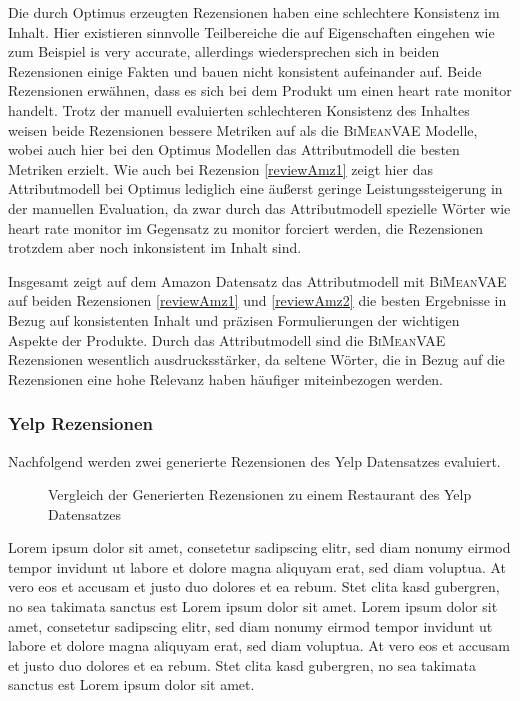 Die durch Optimus erzeugten Rezensionen haben eine schlechtere Konsistenz im Inhalt. 
Hier existieren sinnvolle Teilbereiche die auf Eigenschaften eingehen wie zum Beispiel \glqq{}is very accurate\grqq{}, allerdings wiedersprechen sich in beiden Rezensionen einige Fakten und bauen nicht konsistent aufeinander auf.
Beide Rezensionen erwähnen, dass es sich bei dem Produkt um einen \glqq{}heart rate monitor\grqq{} handelt.
Trotz der manuell evaluierten schlechteren Konsistenz des Inhaltes weisen beide Rezensionen bessere Metriken auf als die \textsc{BiMeanVAE} Modelle, wobei auch hier bei den Optimus Modellen das Attributmodell die besten Metriken erzielt. 
Wie auch bei Rezension \ref{reviewAmz1} zeigt hier das Attributmodell bei Optimus lediglich eine äußerst geringe Leistungssteigerung in der manuellen Evaluation, da zwar durch das Attributmodell spezielle Wörter wie \glqq{}heart rate monitor\grqq{} im Gegensatz zu \glqq{}monitor\grqq{} forciert werden, die Rezensionen trotzdem aber noch inkonsistent im Inhalt sind.

Insgesamt zeigt auf dem Amazon Datensatz das Attributmodell mit \textsc{BiMeanVAE} auf beiden Rezensionen \ref{reviewAmz1} und \ref{reviewAmz2} die besten Ergebnisse in Bezug auf konsistenten Inhalt und präzisen Formulierungen der wichtigen Aspekte der Produkte.
Durch das Attributmodell sind die \textsc{BiMeanVAE} Rezensionen wesentlich ausdrucksstärker, da seltene Wörter, die in Bezug auf die Rezensionen eine hohe Relevanz haben häufiger miteinbezogen werden.

\pagebreak
\subsubsection{Yelp Rezensionen}
Nachfolgend werden zwei generierte Rezensionen des Yelp Datensatzes evaluiert.
\begin{figure}[!h]
    \centering
    \scriptsize
    \caption{Vergleich der Generierten Rezensionen zu einem Restaurant des Yelp Datensatzes}
\end{figure}
Lorem ipsum dolor sit amet, consetetur sadipscing elitr, sed diam nonumy eirmod tempor invidunt ut labore et dolore magna aliquyam erat, sed diam voluptua. At vero eos et accusam et justo duo dolores et ea rebum. Stet clita kasd gubergren, no sea takimata sanctus est Lorem ipsum dolor sit amet. Lorem ipsum dolor sit amet, consetetur sadipscing elitr, sed diam nonumy eirmod tempor invidunt ut labore et dolore magna aliquyam erat, sed diam voluptua. At vero eos et accusam et justo duo dolores et ea rebum. Stet clita kasd gubergren, no sea takimata sanctus est Lorem ipsum dolor sit amet.

\pagebreak
